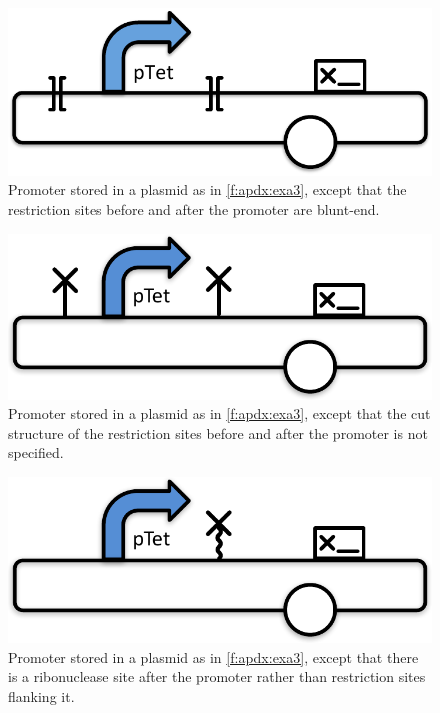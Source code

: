 \begin{figure}[h!]
\includegraphics[scale=0.5]{figures/apdx-examples/apdx-exa4.pdf}
\caption{Promoter stored in a plasmid as in \ref{f:apdx:exa3}, except that the restriction sites before and after the promoter are blunt-end.}
\label{f:apdx:exa4}
\end{figure}

\begin{figure}[h!]
\includegraphics[scale=0.5]{figures/apdx-examples/apdx-exa5.pdf}
\caption{Promoter stored in a plasmid as in \ref{f:apdx:exa3}, except that the cut structure of the restriction sites before and after the promoter is not specified.}
\label{f:apdx:exa5}
\end{figure}

\begin{figure}[h!]
\includegraphics[scale=0.5]{figures/apdx-examples/apdx-exa6.pdf}
\caption{Promoter stored in a plasmid as in \ref{f:apdx:exa3}, except that there is a ribonuclease site after the promoter rather than restriction sites flanking it.}
\label{f:apdx:exa6}
\end{figure}

